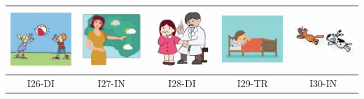\documentclass[12pt,notitlepage]{article}
\begin{document}
\begin{center}
\begin{tabular}{|c||c||c||c||c|}
\includegraphics[width=0.16\columnwidth]{square/I21.jpg} &  \includegraphics[width=0.16\columnwidth]{square/I22.jpg} &  \includegraphics[width=0.16\columnwidth]{square/I23.jpg} & \includegraphics[width=0.16\columnwidth]{square/I24.jpg} & \includegraphics[width=0.16\columnwidth]{square/I25.jpg} \\
\hline
\hline
I26-DI & I27-IN & I28-DI & I29-TR & I30-IN \\

\end{tabular}
\end{center}
\end{document}
